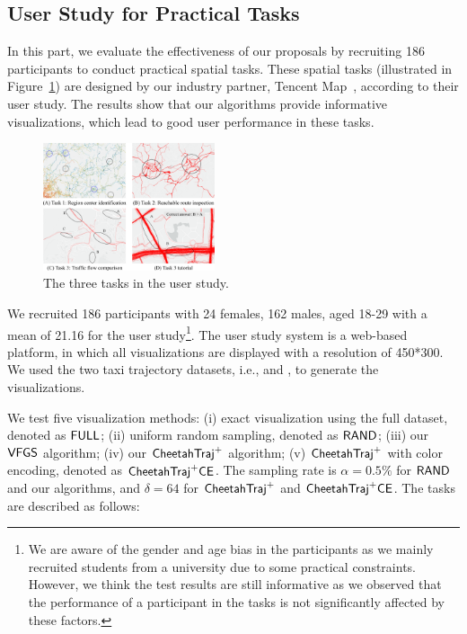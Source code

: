 \subsection{User Study for Practical Tasks}\label{sec:user}

In this part, we evaluate the effectiveness of our proposals by recruiting 186 participants to conduct practical spatial tasks. These spatial tasks (illustrated in Figure~\ref{fig:apps}) are designed by our industry partner, Tencent Map~\cite{tencentmap}, according to their user study. The results show that our algorithms provide informative visualizations, which lead to good user performance in these tasks.

\begin{figure}[t]
	\centering
	\includegraphics[width=0.45\textwidth]{pictures/user_study/interface.pdf}
	\vspace{-3mm}
	\caption{The three tasks in the user study.}
	\label{fig:apps}
	\vspace{-4mm}
\end{figure}


We recruited 186 participants with 24 females, 162 males, aged 18-29 with a mean of 21.16 for the user study\footnote{We are aware of the gender and age bias in the participants as we mainly recruited students from a university due to some practical constraints. However, we think the test results are still informative as we observed that the performance of a participant in the tasks is not significantly affected by these factors.}. The user study system is a web-based platform, in which all visualizations are displayed with a resolution of 450*300. We used the two taxi trajectory datasets, i.e., \pt{} and \sz{}, to generate the visualizations.


We test five visualization methods: (i) exact visualization using the full dataset, denoted as $\mathsf{FULL}$; (ii) uniform random sampling, denoted as $\mathsf{RAND}$; (iii) our $\mathsf{VFGS}$ algorithm; (iv) our $\mathsf{CheetahTraj}^{+}$ algorithm; (v) $\mathsf{CheetahTraj}^{+}$ with color encoding, denoted as $\mathsf{CheetahTraj}^{+}\mathsf{CE}$. The sampling rate is $\alpha = 0.5\%$ for $\mathsf{RAND}$ and our algorithms, and $\delta = 64$ for $\mathsf{CheetahTraj}^{+}$ and $\mathsf{CheetahTraj}^{+}\mathsf{CE}$. The tasks are described as follows:


